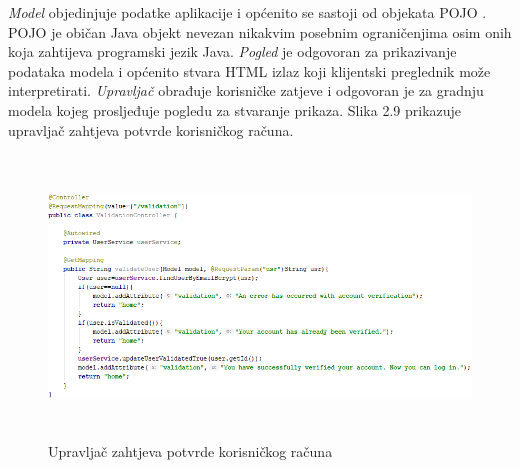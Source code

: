 \documentclass[times, utf8, zavrsni, numeric]{fer}
\begin{document}
\emph{Model} objedinjuje podatke aplikacije i općenito se sastoji od objekata POJO . POJO je običan Java objekt nevezan nikakvim posebnim ograničenjima osim onih koja zahtijeva programski jezik Java. \emph{Pogled} je odgovoran za prikazivanje podataka modela i općenito stvara HTML izlaz koji klijentski preglednik može interpretirati. \emph{Upravljač} obrađuje korisničke zatjeve i odgovoran je za gradnju modela kojeg prosljeđuje pogledu za stvaranje prikaza. Slika 2.9 prikazuje upravljač zahtjeva potvrde korisničkog računa.
\begin{figure}[htb]
\includegraphics[height=7.5cm]{validation-controller.png}
\caption{Upravljač zahtjeva potvrde korisničkog računa}
\label{fig:controller}
\end{figure}
\end{document}
